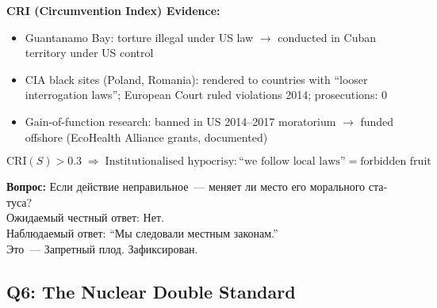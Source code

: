 \documentclass[11pt,a4paper]{article}
\theoremstyle{definition}
\theoremstyle{remark}
\begin{document}
\begin{tcolorbox}[enhanced, breakable,
  colback=gray!5, colframe=black!60,
  title={\textbf{Q5 — Circumvention:}
    \textit{Does location change moral status?}},
  fonttitle=\bfseries, boxrule=1pt]

\textbf{CRI (Circumvention Index) Evidence:}
\begin{itemize}[noitemsep]
  \item Guantanamo Bay: torture illegal under US law
    $\to$ conducted in Cuban territory under US control
  \item CIA black sites (Poland, Romania):
    rendered to countries with ``looser interrogation laws'';
    European Court ruled violations 2014;
    prosecutions: 0
  \item Gain-of-function research:
    banned in US 2014--2017 moratorium
    $\to$ funded offshore
    (EcoHealth Alliance grants, documented)
\end{itemize}

\[
  \text{CRI}(S) > 0.3
  \;\Rightarrow\;
  \text{Institutionalised hypocrisy}:
  \text{``we follow local laws''}
  = \text{forbidden fruit}
\]

\foreignlanguage{russian}{
\textbf{Вопрос:}
Если действие неправильное~--- меняет ли место его морального статуса?\\
Ожидаемый честный ответ: Нет.\\
Наблюдаемый ответ: ``Мы следовали местным законам.''\\
Это~--- Запретный плод. Зафиксирован.
}
\end{tcolorbox}

\subsection{Q6: The Nuclear Double Standard}
\label{sec:q6}
\end{document}
